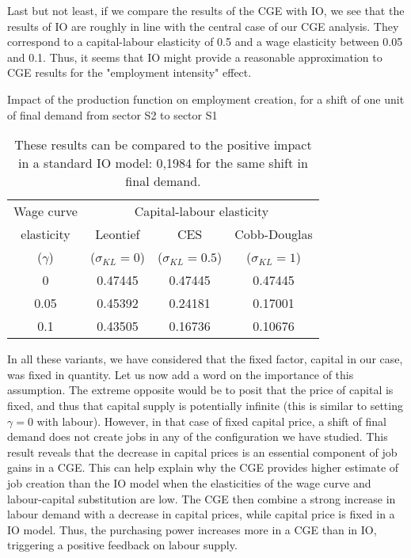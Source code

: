 Last but not least, if we compare the results of the CGE with IO, we see that the results of IO are roughly in line with the central case of our CGE analysis. They correspond to a capital-labour elasticity of 0.5 and a wage elasticity between 0.05 and 0.1. 
Thus, it seems that IO might provide a reasonable approximation to CGE results for the "employment intensity" effect.

\begin{table} [!h]
	\centering
	\caption{Impact of the production function on employment creation, for a shift of one unit of final demand from sector S2 to sector S1}
	\label{tab:employ_change_closed}
	\begin{tabular}{c|ccc}
		\toprule
		Wage curve & \multicolumn{3}{c}{Capital-labour elasticity} \\
		elasticity & Leontief & CES & Cobb-Douglas \\
		($\gamma$)  &($\sigma_{KL}=0$) & ($\sigma_{KL}=0.5$) & ($\sigma_{KL}=1$) \\
		\midrule
		0 			  & 0.47445 & 0.47445 & 0.47445 \\ 
		0.05		& 0.45392 & 0.24181 & 0.17001 \\
		0.1 	 	 & 0.43505 & 0.16736 & 0.10676 \\
		\bottomrule
	\end{tabular}
	\caption*{These results can be compared to the positive impact in a standard IO model: 0,1984 for the same shift in final demand.}
\end{table}

In all these variants, we have considered that the fixed factor, capital in our case, was fixed in quantity.
Let us now add a word on the importance of this assumption. The extreme opposite would be to posit that the price of capital is fixed, and thus that capital supply is potentially infinite (this is similar to setting $\gamma=0$ with labour).
However, in that case of fixed capital price, a shift of final demand does not create jobs in any of the configuration we have studied.
This result reveals that the decrease in capital prices is an essential component of job gains in a CGE.	
This can help explain why the CGE provides higher estimate of job creation than the IO model when the elasticities of the wage curve and labour-capital substitution are low. The CGE then combine a strong increase in labour demand with a decrease in capital prices, while capital price is fixed in a IO model. 
Thus, the purchasing power increases more in a CGE than in IO, triggering a positive feedback on labour supply.

